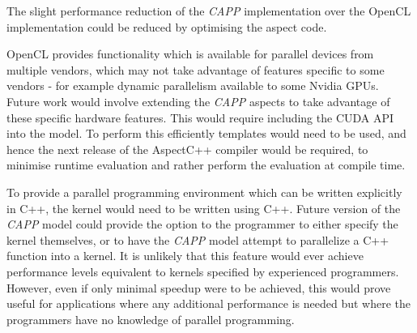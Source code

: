 \documentclass{sig-alternate-05-2015}
\begin{document}
The slight performance reduction of the \textit{CAPP} implementation over the
OpenCL implementation could be reduced by optimising the aspect code.

OpenCL provides functionality which is available for parallel devices from
multiple vendors, which may not take advantage of features specific to some
vendors - for example dynamic parallelism available to some Nvidia GPUs.
Future work would involve extending the \textit{CAPP} aspects to take advantage
of these specific hardware features. This would require including the CUDA API
into the model. To perform this efficiently templates would need to be used, and
hence the next release of the AspectC++ compiler would be required, to
minimise runtime evaluation and rather perform the evaluation at compile time.

To provide a parallel programming environment which can be written explicitly in
C++, the kernel would need to be written using C++. Future version of the
\textit{CAPP} model could provide the option to the programmer to either specify
the kernel themselves, or to have the \textit{CAPP} model attempt to
parallelize a C++ function into a kernel. It is unlikely that this feature would
ever achieve performance levels equivalent to kernels specified by experienced
programmers. However, even if only minimal speedup were to be achieved, this would prove 
useful for applications where any additional performance is needed but where the
programmers have no knowledge of parallel programming. 

%

%
%
\end{document}
